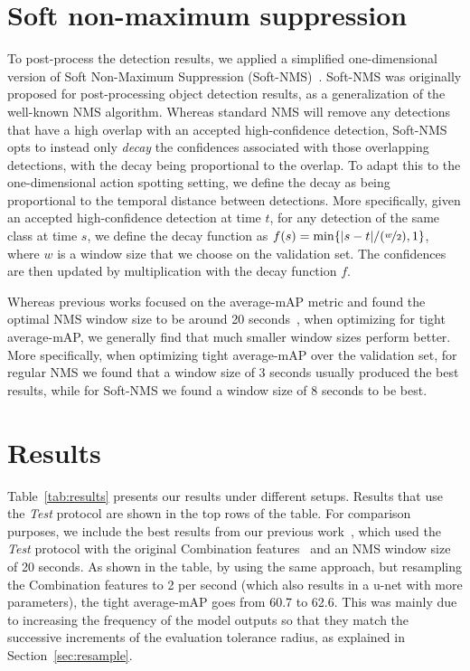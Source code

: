 \documentclass[10pt,twocolumn,letterpaper]{article}
\begin{document}
\section{Soft non-maximum suppression}
\label{sec:nms}

To post-process the detection results, we applied a simplified one-dimensional version of Soft Non-Maximum Suppression (Soft-NMS)~\cite{bodla2017soft}. Soft-NMS was originally proposed for post-processing object detection results, as a generalization of the well-known NMS algorithm. Whereas standard NMS will remove any detections that have a high overlap with an accepted high-confidence detection, Soft-NMS opts to instead only {\it decay} the confidences associated with those overlapping detections, with the decay being proportional to the overlap. To adapt this to the one-dimensional action spotting setting, we define the decay as being proportional to the temporal distance between detections. More specifically, given an accepted high-confidence detection at time $t$, for any detection of the same class at time $s$, we define the decay function as $f(s) = \min\{\abs{s - t} / (\nicefrac{w}{2}), 1\}$, where $w$ is a window size that we choose on the validation set. The confidences are then updated by multiplication with the decay function $f$.

Whereas previous works focused on the average-mAP metric and found the optimal NMS window size to be around 20 seconds~\cite{giancola2021temporally, zhou2021feature, soares2022temporally}, when optimizing for tight average-mAP, we generally find that much smaller window sizes perform better. More specifically, when optimizing tight average-mAP over the validation set, for regular NMS we found that a window size of 3 seconds usually produced the best results, while for Soft-NMS we found a window size of 8 seconds to be best.

\section{Results}
\label{sec:results}



Table~\ref{tab:results} presents our results under different setups. Results that use the {\it Test} protocol are shown in the top rows of the table. For comparison purposes, we include the best results from our previous work~\cite{soares2022temporally}, which used the {\it Test} protocol with the original Combination features~\cite{zhou2021feature} and an NMS window size of 20 seconds. As shown in the table, by using the same approach, but resampling the Combination features to 2 per second (which also results in a u-net with more parameters), the tight average-mAP goes from 60.7 to 62.6. This was mainly due to increasing the frequency of the model outputs so that they match the successive increments of the evaluation tolerance radius, as explained in Section~\ref{sec:resample}.
\end{document}

